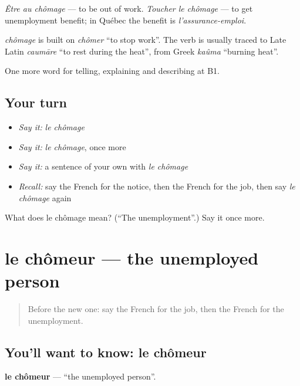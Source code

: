 \emph{Être au chômage} — to be out of work. \emph{Toucher le chômage} — to get unemployment benefit; in Québec the benefit is \emph{l'assurance-emploi}.

\begin{cousinweb}
\emph{chômage} is built on \emph{chômer} \textquotedblleft{}to stop work\textquotedblright{}. The verb is usually traced to Late Latin \emph{caumāre} \textquotedblleft{}to rest during the heat\textquotedblright{}, from Greek \emph{kaûma} \textquotedblleft{}burning heat\textquotedblright{}.
\end{cousinweb}

\begin{grammarlens}[title={What you've built}]
One more word for telling, explaining and describing at B1.
\end{grammarlens}

\subsection*{Your turn}
\begin{itemize}
\raggedright
  \item \emph{Say it:} \emph{le chômage}
  \item \emph{Say it:} \emph{le chômage}, once more
  \item \emph{Say it:} a sentence of your own with \emph{le chômage}
  \item \emph{Recall:} say the French for the notice, then the French for the job, then say \emph{le chômage} again
\end{itemize}

\begin{tcolorbox}[breakable,colback=teal!4,colframe=teal!35!black,title={Before you move on}]
What does le chômage mean? (\textquotedblleft{}The unemployment\textquotedblright{}.) Say it once more.
\end{tcolorbox}
\section[le chômeur]{le chômeur — the unemployed person}

\label{lesson:FR-C356-chomeur}



\begin{quote}
Before the new one: say the French for the job, then the French for the unemployment.
\end{quote}

\subsection*{You'll want to know: le chômeur}
\textbf{le chômeur} — \textquotedblleft{}the unemployed person\textquotedblright{}.


